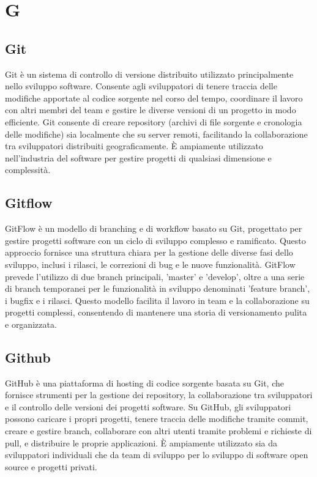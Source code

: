 \section{G} 
\subsection{Git} 
Git è un sistema di controllo di versione distribuito utilizzato principalmente nello sviluppo software. Consente agli sviluppatori di tenere traccia delle modifiche apportate al codice sorgente nel corso del tempo, coordinare il lavoro con altri membri del team e gestire le diverse versioni di un progetto in modo efficiente. Git consente di creare repository (archivi di file sorgente e cronologia delle modifiche) sia localmente che su server remoti, facilitando la collaborazione tra sviluppatori distribuiti geograficamente. È ampiamente utilizzato nell'industria del software per gestire progetti di qualsiasi dimensione e complessità.
\subsection{Gitflow} 
GitFlow è un modello di branching e di workflow basato su Git, progettato per gestire progetti software con un ciclo di sviluppo complesso e ramificato. Questo approccio fornisce una struttura chiara per la gestione delle diverse fasi dello sviluppo, inclusi i rilasci, le correzioni di bug e le nuove funzionalità. GitFlow prevede l'utilizzo di due branch principali, 'master' e 'develop', oltre a una serie di branch temporanei per le funzionalità in sviluppo denominati 'feature branch', i bugfix e i rilasci. Questo modello facilita il lavoro in team e la collaborazione su progetti complessi, consentendo di mantenere una storia di versionamento pulita e organizzata.
\subsection{Github} 
GitHub è una piattaforma di hosting di codice sorgente basata su Git, che fornisce strumenti per la gestione dei repository, la collaborazione tra sviluppatori e il controllo delle versioni dei progetti software. Su GitHub, gli sviluppatori possono caricare i propri progetti, tenere traccia delle modifiche tramite commit, creare e gestire branch, collaborare con altri utenti tramite problemi e richieste di pull, e distribuire le proprie applicazioni. È ampiamente utilizzato sia da sviluppatori individuali che da team di sviluppo per lo sviluppo di software open source e progetti privati.
